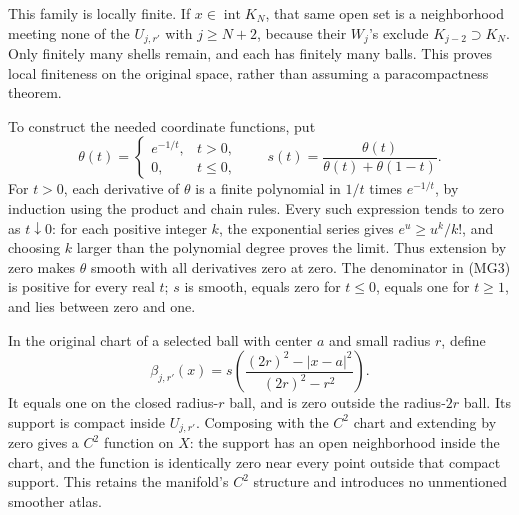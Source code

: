 \documentclass[
  11pt,
]{article}
\begin{document}
This family is locally finite. If \(x\in\operatorname{int}K_N\), that
same open set is a neighborhood meeting none of the \(U_{j,r'}\) with
\(j\geq N+2\), because their \(W_j\)'s exclude \(K_{j-2}\supset K_N\).
Only finitely many shells remain, and each has finitely many balls. This
proves local finiteness on the original space, rather than assuming a
paracompactness theorem.

To construct the needed coordinate functions, put \[
 \theta(t)=
 \begin{cases}e^{-1/t},&t>0,\\0,&t\leq0,\end{cases}
 \qquad
 s(t)=\frac{\theta(t)}{\theta(t)+\theta(1-t)} .
                                                               \tag{MG3}
\] For \(t>0\), each derivative of \(\theta\) is a finite polynomial in
\(1/t\) times \(e^{-1/t}\), by induction using the product and chain
rules. Every such expression tends to zero as \(t\downarrow0\): for each
positive integer \(k\), the exponential series gives \(e^u\geq u^k/k!\),
and choosing \(k\) larger than the polynomial degree proves the limit.
Thus extension by zero makes \(\theta\) smooth with all derivatives zero
at zero. The denominator in (MG3) is positive for every real \(t\);
\(s\) is smooth, equals zero for \(t\leq0\), equals one for \(t\geq1\),
and lies between zero and one.

In the original chart of a selected ball with center \(a\) and small
radius \(r\), define \[
 \beta_{j,r'}(x)
   =s\!\left(\frac{(2r)^2-|x-a|^2}{(2r)^2-r^2}\right).
                                                               \tag{MG4}
\] It equals one on the closed radius-\(r\) ball, and is zero outside
the radius-\(2r\) ball. Its support is compact inside \(U_{j,r'}\).
Composing with the \(C^2\) chart and extending by zero gives a \(C^2\)
function on \(X\): the support has an open neighborhood inside the
chart, and the function is identically zero near every point outside
that compact support. This retains the manifold's \(C^2\) structure and
introduces no unmentioned smoother atlas.
\end{document}
